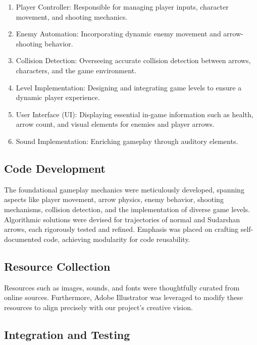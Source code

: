 		\begin{enumerate}
			\item Player Controller:
				Responsible for managing player inputs, character movement, and shooting mechanics.
			
			\item Enemy Automation:
				Incorporating dynamic enemy movement and     arrow-shooting behavior.
			
			\item Collision Detection: 
				 Overseeing accurate collision detection between arrows, characters, and the game environment.
				 
			\item Level Implementation:
					Designing and integrating game levels to ensure a dynamic player experience.
			\item User Interface (UI):
					 Displaying essential in-game information such as health, arrow count, and visual elements for enemies and player arrows.
			\item Sound Implementation:
					Enriching gameplay through auditory elements.
			
		\end{enumerate}
		
 \subsection{Code Development}
			
			The foundational gameplay mechanics were meticulously developed, spanning aspects like player movement, arrow physics, enemy behavior, shooting mechanisms, collision detection, and the implementation of diverse game levels. Algorithmic solutions were devised for trajectories of normal and Sudarshan arrows, each rigorously tested and refined. Emphasis was placed on crafting self-documented code, achieving modularity for code reusability.
	
	 \subsection{Resource Collection}
	
	 		Resources such as images, sounds, and fonts were thoughtfully curated from online sources. Furthermore, Adobe Illustrator was leveraged to modify these resources to align precisely with our project's creative vision.
	 		
	 		
	  \subsection{Integration and Testing}
	 
